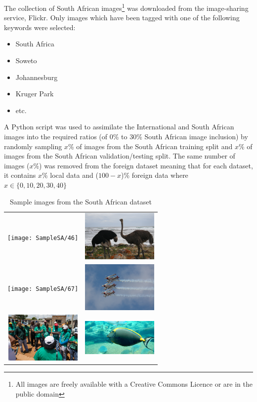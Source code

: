 \documentclass[conference]{IEEEtran}
\begin{document}
The collection of South African images\footnote{All images are freely available with a Creative Commons Licence or are in the public domain} was downloaded from the image-sharing service, Flickr. Only images which have been tagged with one of the following keywords were selected:

\begin{itemize}
	\item South Africa
	\item Soweto
	\item Johannesburg
	\item Kruger Park
	\item etc.
\end{itemize}

A Python script was used to assimilate the International and South African images into the required ratios (of 0\% to 30\% South African image inclusion) by randomly sampling $x$\% of images from the South African training split and $x$\% of images from the South African validation/testing split. The same number of images ($x$\%) was removed from the foreign dataset meaning that for each dataset, it contains $x$\% local data and ($100 - x$)\% foreign data where $x\in\{0, 10, 20, 30, 40\}$

\begin{table}[h!]
\centering
\begin{tabular}{cc}
\texttt{[image: SampleSA/46]} & \includegraphics[width=3.7cm]{SampleSA/61}\\
\texttt{[image: SampleSA/67]} & \includegraphics[width=3.7cm]{SampleSA/69}\\
\includegraphics[width=3.7cm]{SampleSA/106} & \includegraphics[width=3.7cm]{SampleSA/127}\\

\end{tabular}
\caption{Sample images from the South African dataset}
\label{fig:samplesa}
\end{table}
\end{document}
